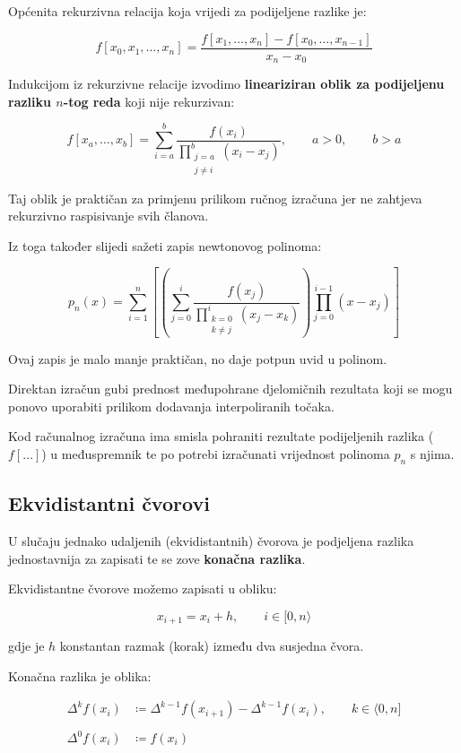 Općenita rekurzivna relacija koja vrijedi za podijeljene razlike je:

$$
f[x_0, x_1, \dots, x_n] = \frac{f[x_1, \dots, x_n]- f[x_0, \dots, x_{n-1}]}{x_n - x_0}
$$

Indukcijom iz rekurzivne relacije izvodimo \textbf{lineariziran oblik za podijeljenu razliku $n$-tog reda} koji nije rekurzivan:

$$
f[x_a, \dots, x_b] = \sum_{i=a}^{b} \frac{f(x_i)}{\prod_{\substack{j=a\\j\neq i}}^b(x_i - x_j)},\qquad a>0,\qquad b>a
$$

Taj oblik je praktičan za primjenu prilikom ručnog izračuna jer ne zahtjeva rekurzivno raspisivanje svih članova.

Iz toga također slijedi sažeti zapis newtonovog polinoma:

$$
p_n(x) = \sum_{i=1}^{n}\left[\left(\sum_{j=0}^{i} \frac{f(x_j)}{\prod_{\substack{k=0\\k\neq j}}^i(x_j - x_k)}\right)\prod_{j=0}^{i-1}(x-x_j)\right]
$$

Ovaj zapis je malo manje praktičan, no daje potpun uvid u polinom.

\begin{warningbox}[međupohrana]
    Direktan izračun gubi prednost međupohrane djelomičnih rezultata koji se mogu ponovo uporabiti prilikom dodavanja interpoliranih točaka.

    Kod računalnog izračuna ima smisla pohraniti rezultate podijeljenih razlika ($f[\dots]$) u međuspremnik te po potrebi izračunati vrijednost polinoma $p_n$ s njima.
\end{warningbox}

\newpage

\subsection{Ekvidistantni čvorovi}

U slučaju jednako udaljenih (ekvidistantnih) čvorova je podjeljena razlika jednostavnija za zapisati te se zove \textbf{konačna razlika}.

Ekvidistantne čvorove možemo zapisati u obliku:

$$
x_{i+1}=x_i+h,\qquad i\in[0,n\rangle
$$

gdje je $h$ konstantan razmak (korak) između dva susjedna čvora.

Konačna razlika je oblika:

\begin{align}
\label{kon_razl}
\Delta^kf(x_i) &\coloneq \Delta^{k-1}f(x_{i+1}) - \Delta^{k-1}f(x_i),\qquad k\in\langle0,n]\\\nonumber\\
\Delta^0f(x_i) &\coloneq f(x_i)\nonumber
\end{align}

